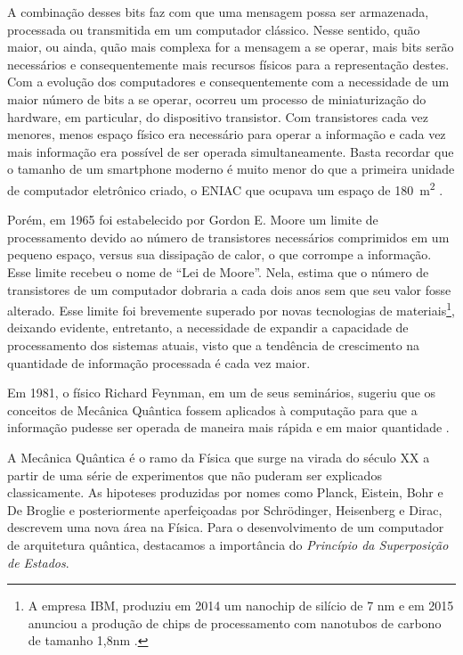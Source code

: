 \documentclass[11pt,oneside,brazil,hidelinks,article,sumario=tradicional,a4paper]{abntex2}
\begin{document}
A combinação desses bits faz com que uma mensagem possa ser armazenada, processada ou transmitida em um computador clássico. Nesse sentido, quão maior, ou ainda, quão mais complexa for a mensagem a se operar, mais bits serão necessários e consequentemente mais recursos físicos para a representação destes. Com a evolução dos computadores e consequentemente com a necessidade de um maior número de bits a se operar, ocorreu um processo de miniaturização do hardware, em particular, do dispositivo transistor. Com transistores cada vez menores, menos espaço físico era necessário para operar a informação e cada vez mais informação era possível de ser operada simultaneamente. Basta recordar que o tamanho de um smartphone moderno é muito menor do que a primeira unidade de computador eletrônico criado, o ENIAC que ocupava um espaço de \SI{180}{\square\meter} \cite{eniac}.

Porém, em 1965 foi estabelecido por Gordon E. Moore um limite de processamento devido ao número de transistores necessários comprimidos em um pequeno espaço, versus sua dissipação de calor, o que corrompe a informação. Esse limite recebeu o nome de ``Lei de Moore''. Nela, \textcite{moore} estima que o número de transistores de um computador dobraria a cada dois anos sem que seu valor fosse alterado. Esse limite foi brevemente superado por novas tecnologias de materiais\footnote{A empresa IBM, produziu em 2014 um nanochip de silício de 7 nm e em 2015 anunciou a produção de chips de processamento com nanotubos de carbono de tamanho 1,8nm \cite{chipibm}.}, deixando evidente, entretanto, a necessidade de expandir a capacidade de processamento dos sistemas atuais, visto que a tendência de crescimento na quantidade de informação processada é cada vez maior.

Em 1981, o físico Richard Feynman, em um de seus seminários, sugeriu que os conceitos de Mecânica Quântica fossem aplicados à computação para que a informação pudesse ser operada de maneira mais rápida e em maior quantidade \cite{TeoQuanInfoEntreCopia}.

A Mecânica Quântica é o ramo da Física que surge na virada do século XX a partir de uma série de experimentos que não puderam ser explicados classicamente. As hipoteses produzidas por nomes como Planck, Eistein, Bohr e De Broglie e posteriormente aperfeiçoadas por Schrödinger, Heisenberg e Dirac, descrevem uma nova área na Física. Para o desenvolvimento de um computador de arquitetura quântica, destacamos a importância do \textit{Princípio da Superposição de Estados}.
\end{document}

